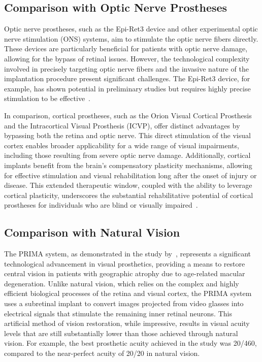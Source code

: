 \documentclass[twocolumn,10pt]{article}
\begin{document}
\subsection*{Comparison with Optic Nerve Prostheses}
Optic nerve prostheses, such as the Epi-Ret3 device and other experimental optic nerve stimulation (ONS) systems, aim to stimulate the optic nerve fibers directly. These devices are particularly beneficial for patients with optic nerve damage, allowing for the bypass of retinal issues. However, the technological complexity involved in precisely targeting optic nerve fibers and the invasive nature of the implantation procedure present significant challenges. The Epi-Ret3 device, for example, has shown potential in preliminary studies but requires highly precise stimulation to be effective~\parencite{trieuImplantsEpiretinalStimulation2009}.

In comparison, cortical prostheses, such as the Orion Visual Cortical Prosthesis
and the Intracortical Visual Prosthesis (ICVP), offer distinct advantages by
bypassing both the retina and optic nerve. This direct stimulation of the visual
cortex enables broader applicability for a wide range of visual impairments,
including those resulting from severe optic nerve damage. Additionally, cortical
implants benefit from the brain's compensatory plasticity mechanisms, allowing
for effective stimulation and visual rehabilitation long after the onset of
injury or disease. This extended therapeutic window, coupled with the ability to
leverage cortical plasticity, underscores the substantial rehabilitative
potential of cortical prostheses for individuals who are blind or visually
impaired~\parencite{beyelerLearningSeeAgain2017}.

\subsection*{Comparison with Natural Vision}
The PRIMA system, as demonstrated in the study
by~\textcite{palankerSimultaneousPerceptionProsthetic2022}, represents a
significant technological advancement in visual prosthetics, providing a means
to restore central vision in patients with geographic atrophy due to age-related
macular degeneration. Unlike natural vision, which relies on the complex and
highly efficient biological processes of the retina and visual cortex, the PRIMA
system uses a subretinal implant to convert images projected from video glasses
into electrical signals that stimulate the remaining inner retinal neurons. This
artificial method of vision restoration, while impressive, results in visual
acuity levels that are still substantially lower than those achieved through
natural vision. For example, the best prosthetic acuity achieved in the study
was 20/460, compared to the near-perfect acuity of 20/20 in natural vision.
\end{document}
